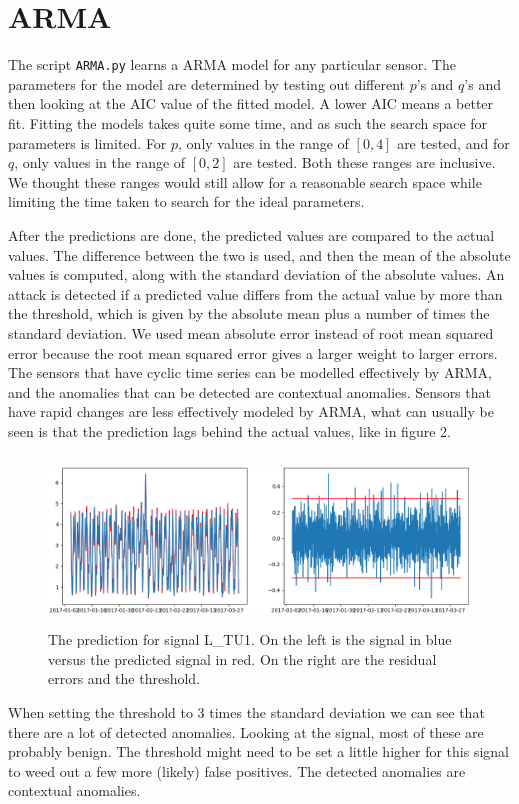 \documentclass[]{article}
\begin{document}
\clearpage
\section{ARMA}
The script \texttt{ARMA.py} learns a ARMA model for any particular sensor. The parameters for the model are determined by testing out different $p$'s and $q$'s and then looking at the AIC value of the fitted model. A lower AIC means a better fit. Fitting the models takes quite some time, and as such the search space for parameters is limited. For $p$, only values in the range of $[0, 4]$ are tested, and for $q$, only values in the range of $[0, 2]$ are tested. Both these ranges are inclusive. We thought these ranges would still allow for a reasonable search space while limiting the time taken to search for the ideal parameters.

After the predictions are done, the predicted values are compared to the actual values. The difference between the two is used, and then the mean of the absolute values is computed, along with the standard deviation of the absolute values. An attack is detected if a predicted value differs from the actual value by more than the threshold, which is given by the absolute mean plus a number of times the standard deviation. We used mean absolute error instead of root mean squared error because the root mean squared error gives a larger weight to larger errors. The sensors that have cyclic time series can be modelled effectively by ARMA, and the anomalies that can be detected are contextual anomalies. Sensors that have rapid changes are less effectively modeled by ARMA, what can usually be seen is that the prediction lags behind the actual values, like in figure 2. 
\begin{center}
\begin{figure}[H]
  \includegraphics[width=16cm, height=4.5cm]{./visuallizations/arma_3stddev_LTU1.png}
  \caption{The prediction for signal L\_TU1. On the left is the signal in blue versus the predicted signal in red. On the right are the residual errors and the threshold.}
  \label{signals}
\end{figure}
\end{center}
When setting the threshold to 3 times the standard deviation we can see that there are a lot of detected anomalies. Looking at the signal, most of these are probably benign. The threshold might need to be set a little higher for this signal to weed out a few more (likely) false positives. The detected anomalies are contextual anomalies.
\end{document}
